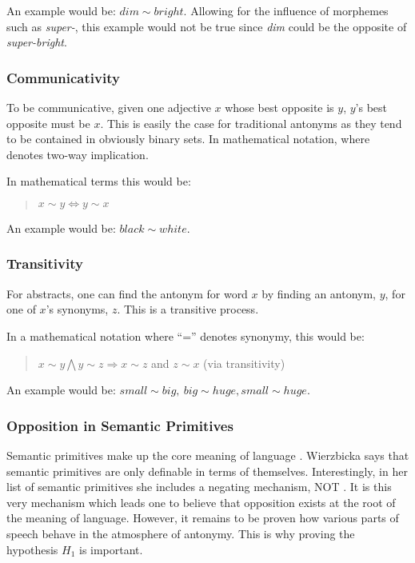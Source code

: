 An example would be: $dim\sim bright$.  Allowing for the influence of morphemes such as \textit{super-}, this example would not be true since \textit{dim} could be the opposite of \textit{super-bright}.

\subsubsection {Communicativity} 
To be communicative, given one adjective $x$ whose best opposite is $y$, $y$’s best opposite must be $x$.  This is easily the case for traditional antonyms as they tend to be contained in obviously binary sets. In mathematical notation, where  denotes two-way implication.  

In mathematical terms this would be: 
	\begin{quote}
		$x\sim y \Leftrightarrow y\sim x$
	\end{quote}

An example would be: $black\sim white$.

\subsubsection {Transitivity} 
For abstracts, one can find the antonym for word $x$ by finding an antonym, $y$, for one of $x$’s synonyms, $z$.  This is a transitive process.  

In a mathematical notation where ``='' denotes synonymy, this would be: 
	\begin{quote}
		$x\sim y\bigwedge y\sim z \Rightarrow x\sim z$ and
		$z\sim x$ (via transitivity)
	\end{quote}

An example would be: $small\sim big, ~big\sim huge, small\sim huge$.

%

\subsubsection {Opposition in Semantic Primitives} 
Semantic primitives make up the core meaning of language \cite{Wierzbicka}.  Wierzbicka says that semantic primitives are only definable in terms of themselves.  Interestingly, in her list of semantic primitives she includes a negating mechanism, NOT \cite{Wierzbicka}.  It is this very mechanism which leads one to believe that opposition exists at the root of the meaning of language.  However, it remains to be proven how various parts of speech behave in the atmosphere of antonymy.  This is why proving the hypothesis $H_{1}$ is important.

